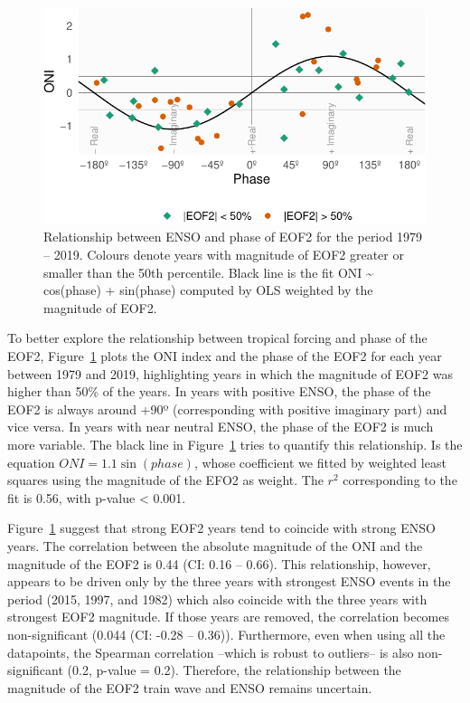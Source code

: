 \documentclass[smallextended]{svjour3}       %
\begin{document}
\begin{figure}
\centering
\includegraphics{../figures/enso-phase-1.pdf}
\caption{\label{fig:enso-phase}Relationship between ENSO and phase of EOF2 for the period 1979 -- 2019. Colours denote years with magnitude of EOF2 greater or smaller than the 50th percentile. Black line is the fit ONI \textasciitilde{} cos(phase) + sin(phase) computed by OLS weighted by the magnitude of EOF2.}
\end{figure}

To better explore the relationship between tropical forcing and phase of the EOF2, Figure~\ref{fig:enso-phase} plots the ONI index and the phase of the EOF2 for each year between 1979 and 2019, highlighting years in which the magnitude of EOF2 was higher than 50\% of the years. In years with positive ENSO, the phase of the EOF2 is always around +90º (corresponding with positive imaginary part) and vice versa. In years with near neutral ENSO, the phase of the EOF2 is much more variable. The black line in Figure~\ref{fig:enso-phase} tries to quantify this relationship. Is the equation \(ONI = 1.1\sin{(phase)}\), whose coefficient we fitted by weighted least squares using the magnitude of the EFO2 as weight. The \(r^2\) corresponding to the fit is 0.56, with p-value \textless{} 0.001.

Figure~\ref{fig:enso-phase} suggest that strong EOF2 years tend to coincide with strong ENSO years. The correlation between the absolute magnitude of the ONI and the magnitude of the EOF2 is 0.44 (CI: 0.16 -- 0.66). This relationship, however, appears to be driven only by the three years with strongest ENSO events in the period (2015, 1997, and 1982) which also coincide with the three years with strongest EOF2 magnitude. If those years are removed, the correlation becomes non-significant (0.044 (CI: -0.28 -- 0.36)). Furthermore, even when using all the datapoints, the Spearman correlation --which is robust to outliers-- is also non-significant (0.2, p-value = 0.2). Therefore, the relationship between the magnitude of the EOF2 train wave and ENSO remains uncertain.
\end{document}
